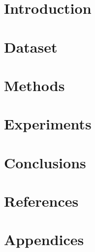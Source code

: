 \documentclass{article}
\begin{document}


\setcounter{tocdepth}{5}
\tableofcontents
\pagebreak

\listoffigures
\listoftables
\pagebreak
{}

\section{Introduction}


\section{Dataset}


\section{Methods}


\section{Experiments}


\section{Conclusions}


\section{References}
\printbibliography[heading=none]

\section{Appendices}

\end{document}
